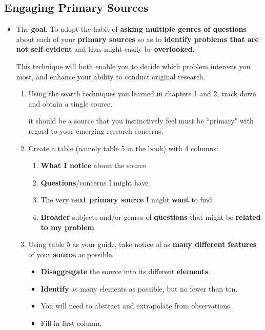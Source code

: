\documentclass[11pt]{article}
\begin{document}
\subsection{Engaging Primary Sources}
\begin{itemize}
\item  \begin{exercise}

The \textbf{goal}: To adopt the habit of \textbf{asking multiple genres of questions} about each of your \textbf{primary sources} so as to \textbf{identify problems that are not self-evident} and thus might easily be \textbf{overlooked}. 

This technique will both enable you to decide which problem interests you most, and enhance your ability to conduct original research.

\begin{enumerate}
\item Using the search techniques you learned in chapters 1 and 2, track down and obtain a single source. 

it should be a source that you instinctively feel must be ``primary" with regard to your emerging research concerns.

\item Create a table (namely table 5 in the book) with 4 columns:
\begin{enumerate}
\item \textbf{What I notice} about the source 
\item \textbf{Questions}/concerns I might have
\item The very n\textbf{ext primary source} I might \textbf{want} to find
\item \textbf{Broader} subjects and/or genres of \textbf{questions} that might be \textbf{related to my problem}
\end{enumerate}

\item Using table 5 as your guide, take notice of as \textbf{many different features} of your \textbf{source} as possible. 
\begin{itemize}
\item \textbf{Disaggregate} the source into its different \textbf{elements}. 
\item  \textbf{Identify} as many elements as possible, but no fewer than ten.
\item  You will need to abstract and extrapolate from observations. 
\item Fill in first column.
\end{itemize}



\end{enumerate}
\end{exercise}
\end{itemize}
\end{document}
